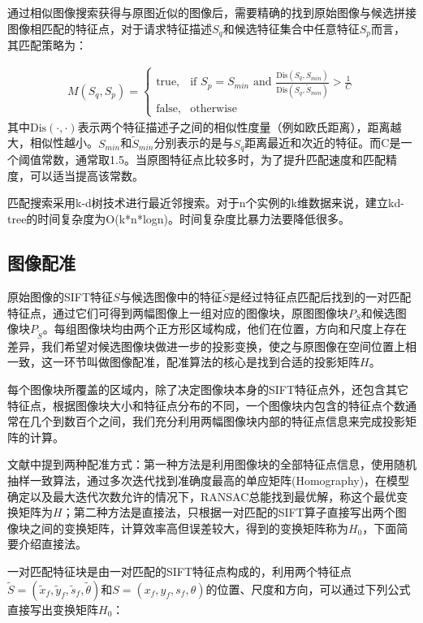\documentclass[UTF8]{csoarticle}
\begin{document}
通过相似图像搜索获得与原图近似的图像后，需要精确的找到原始图像与候选拼接图像相匹配的特征点，对于请求特征描述\(S_q\)和候选特征集合中任意特征\(S_p\)而言，其匹配策略为：

\begin{align}
  M(S_q,S_p) = 
\begin{cases} 
\text{true}, & \mbox{if } S_p = S_{min}\text{ and }\frac{\text{Dis}(S_q,S_{min})}{\text{Dis}(S_q,\tilde{S}_{min})} > \frac{1}{C} \\
\text{false}, & \mbox{otherwise}
\end{cases}
\end{align}
其中\(\text{Dis}(\cdot,\cdot)\)表示两个特征描述子之间的相似性度量（例如欧氏距离），距离越大，相似性越小。\(S_{min}\)和\(\tilde{S}_{min}\)分别表示的是与\(S_q\)距离最近和次近的特征。而C是一个阈值常数，通常取1.5。当原图特征点比较多时，为了提升匹配速度和匹配精度，可以适当提高该常数。

匹配搜索采用k-d树技术进行最近邻搜索。对于n个实例的k维数据来说，建立kd-tree的时间复杂度为O(k*n*logn)。时间复杂度比暴力法要降低很多。

\subsection{图像配准}
原始图像的SIFT特征\(S\)与候选图像中的特征\(\tilde{S}\)是经过特征点匹配后找到的一对匹配特征点，通过它们可得到两幅图像上一组对应的图像块，原图图像块\(P_S\)和候选图像块\(P_{\tilde{S}}\)。每组图像块均由两个正方形区域构成，他们在位置，方向和尺度上存在差异，我们希望对候选图像块做进一步的投影变换，使之与原图像在空间位置上相一致，这一环节叫做图像配准，配准算法的核心是找到合适的投影矩阵\(H\)。

每个图像块所覆盖的区域内，除了决定图像块本身的SIFT特征点外，还包含其它特征点，根据图像块大小和特征点分布的不同，一个图像块内包含的特征点个数通常在几个到数百个之间，我们充分利用两幅图像块内部的特征点信息来完成投影矩阵的计算。

文献\cite{Dai:2012vn}中提到两种配准方式：第一种方法是利用图像块的全部特征点信息，使用随机抽样一致算法，通过多次迭代找到准确度最高的单应矩阵(Homography)，在模型确定以及最大迭代次数允许的情况下，RANSAC总能找到最优解，称这个最优变换矩阵为\(H\)；第二种方法是直接法，只根据一对匹配的SIFT算子直接写出两个图像块之间的变换矩阵，计算效率高但误差较大，得到的变换矩阵称为\(H_0\)，下面简要介绍直接法。

一对匹配特征块是由一对匹配的SIFT特征点构成的，利用两个特征点\(\tilde{S}=(\tilde{x}_f,\tilde{y}_f,\tilde{s}_f,\tilde{\theta})\)和\(S=(x_f,y_f,s_f,\theta)\)的位置、尺度和方向，可以通过下列公式直接写出变换矩阵\(H_0\)：
\end{document}
